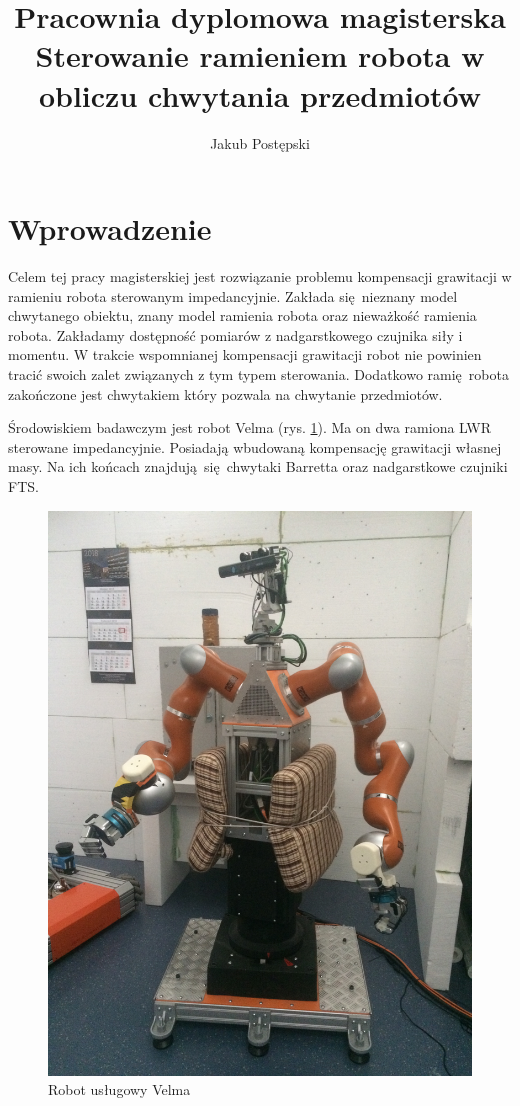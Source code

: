 \documentclass[12pt,a4paper]{article}
\begin{document}
	\title{Pracownia dyplomowa magisterska \\ Sterowanie ramieniem robota w obliczu chwytania przedmiotów}
	\author{Jakub Postępski}
	\maketitle


	\section{Wprowadzenie}
	Celem tej pracy magisterskiej jest rozwiązanie problemu kompensacji grawitacji w ramieniu robota sterowanym impedancyjnie. Zakłada się nieznany model chwytanego obiektu, znany model ramienia robota oraz nieważkość ramienia robota. Zakładamy dostępność pomiarów z nadgarstkowego czujnika siły i momentu. W trakcie wspomnianej kompensacji grawitacji robot nie powinien tracić swoich zalet związanych z tym typem sterowania. Dodatkowo ramię robota zakończone jest chwytakiem który pozwala na chwytanie przedmiotów.

	Środowiskiem badawczym jest robot Velma\cite{velma} (rys. \ref{fig:velma}). Ma on dwa ramiona LWR\cite{lwr} sterowane impedancyjnie. Posiadają wbudowaną kompensację grawitacji własnej masy. Na ich końcach znajdują się chwytaki Barretta oraz nadgarstkowe czujniki FTS.

	\begin{figure}[H]
		\centering
		\includegraphics[scale=0.05, angle =-90]{velma}
		\caption{Robot usługowy Velma}
		\label{fig:velma}
	\end{figure}
\end{document}
